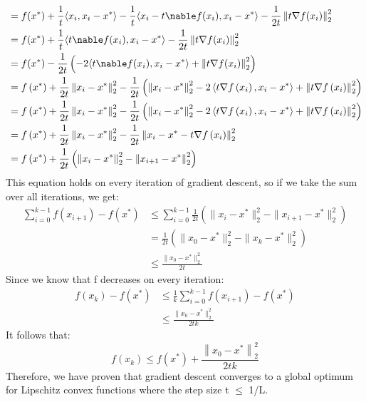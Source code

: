 \documentclass[11pt]{article}
\newcommand{\norm}[1]{\left\lVert#1\right\rVert}
\begin{document}
\begin{enumerate}
\begin{equation}
\begin{split}
    & = f(x^{*}) + \frac{1}{t}\langle x_{i}, x_{i} - x^{*}\rangle - \frac{1}{t}\langle x_{i} - t\nable f(x_i), x_{i} - x^{*}\rangle - \frac{1}{2t}\norm{t\nabla f(x_{i})}_2^2 \\
    & = f(x^{*}) + \frac{1}{t}\langle t\nable f(x_i), x_{i} - x^{*}\rangle - \frac{1}{2t}\norm{t\nabla f(x_{i})}_2^2 \\
    & = f(x^{*}) - \frac{1}{2t}\left(-2\langle t\nable f(x_i), x_{i} - x^{*}\rangle + \norm{t\nabla f(x_{i})}_2^2 \right) \\
    & = f\left(x^{*}\right)+\frac{1}{2 t}\left\|x_{i}-x^{*}\right\|_{2}^{2}-\frac{1}{2 t}\left(\left\|x_{i}-x^{*}\right\|_{2}^{2}-2\left\langle t \nabla f\left(x_{i}\right), x_{i}-x^{*}\right\rangle+\left\|t \nabla f\left(x_{i}\right)\right\|_{2}^{2}\right) \\
    & = f\left(x^{*}\right)+\frac{1}{2 t}\left\|x_{i}-x^{*}\right\|_{2}^{2}-\frac{1}{2 t}\left(\left\|x_{i}-x^{*}\right\|_{2}^{2}-2\left\langle t \nabla f\left(x_{i}\right), x_{i}-x^{*}\right\rangle+\left\|t \nabla f\left(x_{i}\right)\right\|_{2}^{2}\right) \\
    & = f\left(x^{*}\right)+\frac{1}{2 t}\left\|x_{i}-x^{*}\right\|_{2}^{2}-\frac{1}{2 t}\left\|x_{i}-x^{*}-t \nabla f\left(x_{i}\right)\right\|_{2}^{2} \\
    & = f\left(x^{*}\right)+\frac{1}{2 t}\left(\left\|x_{i}-x^{*}\right\|_{2}^{2}-\left\|x_{i+1}-x^{*}\right\|_{2}^{2}\right) \\
    \end{split}
    \end{equation}
    This equation holds on every iteration of gradient descent, so if we take the sum over all iterations, we get: 
    \begin{align}
    \sum_{i=0}^{k-1} f(x_{i+1})-f(x^{*}) & \leq \sum_{i=0}^{k-1} \frac{1}{2t}(\|x_{i}-x^{*}\|_{2}^{2}-\|x_{i+1}-x^{*}\|_{2}^{2}) \\
    &=\frac{1}{2 t}(\|x_{0}-x^{*}\|_{2}^{2}-\|x_{k}-x^{*}\|_{2}^{2}) \\
    & \leq \frac{\|x_{0}-x^{*}\|_{2}^{2}}{2t}
    \end{align}
    Since we know that f decreases on every iteration:
    \begin{align}
    f(x_k) - f(x^*) & \leq \frac{1}{k}\sum_{i=0}^{k-1} f(x_{i+1})-f(x^{*}) \\
    & \leq \frac{\|x_{0}-x^{*}\|_{2}^{2}}{2tk}
    \end{align}
    It follows that: 
    \[
    f(x_k) \leq f(x^*) + \frac{\norm{x_0-x^*}_2^2}{2tk}
    \]
    Therefore, we have proven that gradient descent converges to a global optimum for Lipschitz convex functions where the step size t $\leq$ 1/L.
\end{enumerate}
\end{document}
